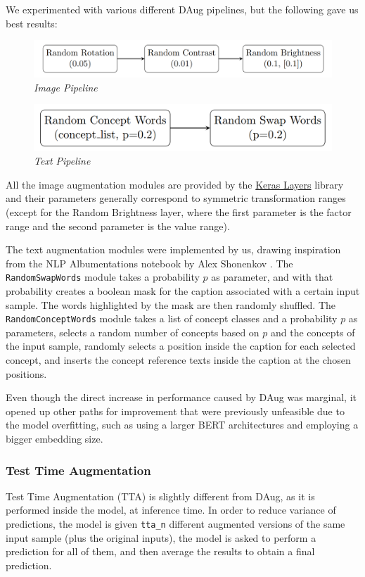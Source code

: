 \documentclass[10pt,twocolumn,letterpaper]{article}
\begin{document}
We experimented with various different DAug pipelines, but the following gave us best results:
\begin{figure}[H]
   \centering
   \includegraphics[width=1\linewidth]{img/Tikz_Daug_1.png}
   \caption{\textit{Image Pipeline}}
\end{figure}
\begin{figure}[H]
   \centering
   \includegraphics[width=0.8\linewidth]{img/Tikz_Daug_2.png}
   \caption{\textit{Text Pipeline}}
\end{figure}

All the image augmentation modules are provided by the \href{https://www.tensorflow.org/api_docs/python/tf/keras/layers/}{Keras Layers} library and their parameters generally correspond to symmetric transformation ranges (except for the Random Brightness layer, where the first parameter is the factor range and the second parameter is the value range).

The text augmentation modules were implemented by us, drawing inspiration from the NLP Albumentations notebook by Alex Shonenkov \cite{nlp_alb}.
The \texttt{RandomSwapWords} module takes a probability $p$ as parameter, and with that probability creates a boolean mask for the caption associated with a certain input sample. The words highlighted by the mask are then randomly shuffled.
The \texttt{RandomConceptWords} module takes a list of concept classes and a probability $p$ as parameters, selects a random number of concepts based on $p$ and the concepts of the input sample, randomly selects a position inside the caption for each selected concept, and inserts the concept reference texts inside the caption at the chosen positions.

Even though the direct increase in performance caused by DAug was marginal, it opened up other paths for improvement that were previously unfeasible due to the model overfitting, such as using a larger BERT architectures and employing a bigger embedding size.

\subsubsection{Test Time Augmentation}
Test Time Augmentation (TTA) is slightly different from DAug, as it is performed inside the model, at inference time.
In order to reduce variance of predictions, the model is given \texttt{tta\_n} different augmented versions of the same input sample (plus the original inputs), the model is asked to perform a prediction for all of them, and then average the results to obtain a final prediction.
\end{document}
